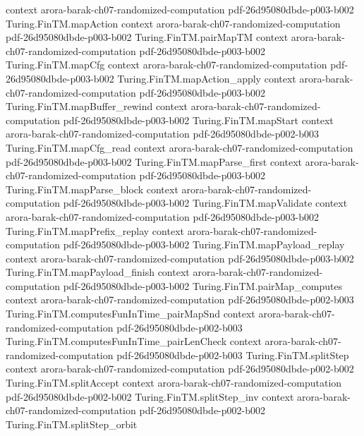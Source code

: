 \begin{theorem}
  {context}
  {arora-barak-ch07-randomized-computation}
  {pdf-26d95080dbde-p003-b002}
\proofstep
  {Turing.FinTM.mapAction}
  {context}
  {arora-barak-ch07-randomized-computation}
  {pdf-26d95080dbde-p003-b002}
\proofstep
  {Turing.FinTM.pairMapTM}
  {context}
  {arora-barak-ch07-randomized-computation}
  {pdf-26d95080dbde-p003-b002}
\proofstep
  {Turing.FinTM.mapCfg}
  {context}
  {arora-barak-ch07-randomized-computation}
  {pdf-26d95080dbde-p003-b002}
\proofstep
  {Turing.FinTM.mapAction_apply}
  {context}
  {arora-barak-ch07-randomized-computation}
  {pdf-26d95080dbde-p003-b002}
\proofstep
  {Turing.FinTM.mapBuffer_rewind}
  {context}
  {arora-barak-ch07-randomized-computation}
  {pdf-26d95080dbde-p003-b002}
\proofstep
  {Turing.FinTM.mapStart}
  {context}
  {arora-barak-ch07-randomized-computation}
  {pdf-26d95080dbde-p002-b003}
\proofstep
  {Turing.FinTM.mapCfg_read}
  {context}
  {arora-barak-ch07-randomized-computation}
  {pdf-26d95080dbde-p003-b002}
\proofstep
  {Turing.FinTM.mapParse_first}
  {context}
  {arora-barak-ch07-randomized-computation}
  {pdf-26d95080dbde-p003-b002}
\proofstep
  {Turing.FinTM.mapParse_block}
  {context}
  {arora-barak-ch07-randomized-computation}
  {pdf-26d95080dbde-p003-b002}
\proofstep
  {Turing.FinTM.mapValidate}
  {context}
  {arora-barak-ch07-randomized-computation}
  {pdf-26d95080dbde-p003-b002}
\proofstep
  {Turing.FinTM.mapPrefix_replay}
  {context}
  {arora-barak-ch07-randomized-computation}
  {pdf-26d95080dbde-p003-b002}
\proofstep
  {Turing.FinTM.mapPayload_replay}
  {context}
  {arora-barak-ch07-randomized-computation}
  {pdf-26d95080dbde-p003-b002}
\proofstep
  {Turing.FinTM.mapPayload_finish}
  {context}
  {arora-barak-ch07-randomized-computation}
  {pdf-26d95080dbde-p003-b002}
\proofstep
  {Turing.FinTM.pairMap_computes}
  {context}
  {arora-barak-ch07-randomized-computation}
  {pdf-26d95080dbde-p002-b003}
\proofstep
  {Turing.FinTM.computesFunInTime_pairMapSnd}
  {context}
  {arora-barak-ch07-randomized-computation}
  {pdf-26d95080dbde-p002-b003}
\proofstep
  {Turing.FinTM.computesFunInTime_pairLenCheck}
  {context}
  {arora-barak-ch07-randomized-computation}
  {pdf-26d95080dbde-p002-b003}
\proofstep
  {Turing.FinTM.splitStep}
  {context}
  {arora-barak-ch07-randomized-computation}
  {pdf-26d95080dbde-p002-b002}
\proofstep
  {Turing.FinTM.splitAccept}
  {context}
  {arora-barak-ch07-randomized-computation}
  {pdf-26d95080dbde-p002-b002}
\proofstep
  {Turing.FinTM.splitStep_inv}
  {context}
  {arora-barak-ch07-randomized-computation}
  {pdf-26d95080dbde-p002-b002}
\proofstep
  {Turing.FinTM.splitStep_orbit}

\end{theorem}
